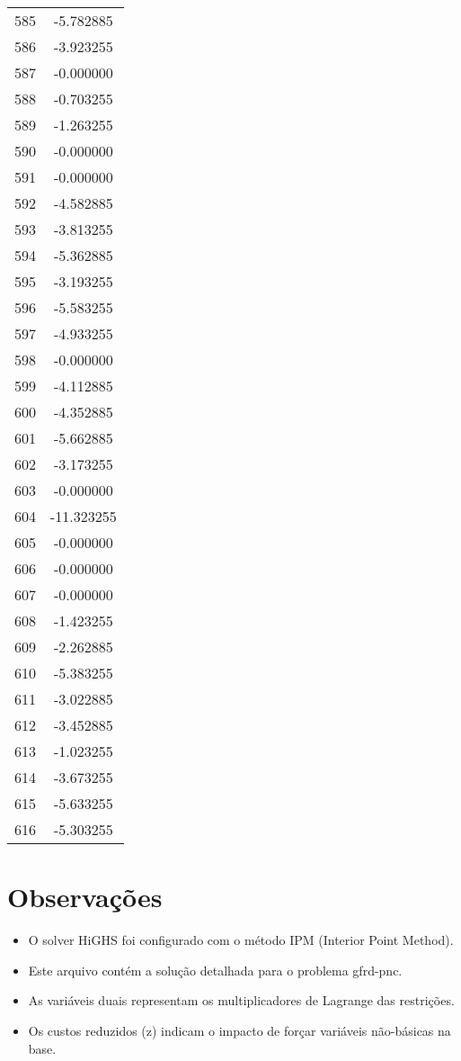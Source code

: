 \documentclass[12pt]{article}
\begin{document}
\begin{longtable}{@{}cc@{}}
585 & -5.782885 \\
586 & -3.923255 \\
587 & -0.000000 \\
588 & -0.703255 \\
589 & -1.263255 \\
590 & -0.000000 \\
591 & -0.000000 \\
592 & -4.582885 \\
593 & -3.813255 \\
594 & -5.362885 \\
595 & -3.193255 \\
596 & -5.583255 \\
597 & -4.933255 \\
598 & -0.000000 \\
599 & -4.112885 \\
600 & -4.352885 \\
601 & -5.662885 \\
602 & -3.173255 \\
603 & -0.000000 \\
604 & -11.323255 \\
605 & -0.000000 \\
606 & -0.000000 \\
607 & -0.000000 \\
608 & -1.423255 \\
609 & -2.262885 \\
610 & -5.383255 \\
611 & -3.022885 \\
612 & -3.452885 \\
613 & -1.023255 \\
614 & -3.673255 \\
615 & -5.633255 \\
616 & -5.303255 \\

\end{longtable}


\section{Observações}

\begin{itemize}
\item O solver HiGHS foi configurado com o método IPM (Interior Point Method).
\item Este arquivo contém a solução detalhada para o problema gfrd-pnc.
\item As variáveis duais representam os multiplicadores de Lagrange das restrições.
\item Os custos reduzidos (z) indicam o impacto de forçar variáveis não-básicas na base.
\end{itemize}
\end{document}
